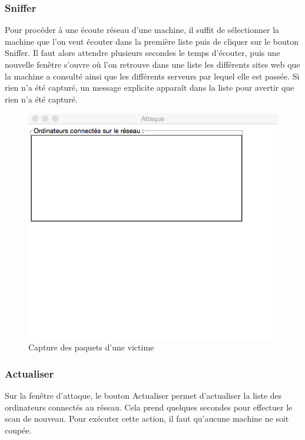 \documentclass[11pt]{article}
\begin{document}
\subsubsection{Sniffer}
Pour procéder à une écoute réseau d'une machine, il suffit de sélectionner la machine que l'on veut écouter dans la première liste puis de cliquer sur le bouton Sniffer. Il faut alors attendre plusieurs secondes le temps d'écouter, puis une nouvelle fenêtre s'ouvre où l'on retrouve dans une liste les différents sites web que la machine a consulté ainsi que les différents serveurs par lequel elle est passée. Si rien n'a été capturé, un message explicite apparaît dans la liste pour avertir que rien n'a été capturé.
\begin{figure}[!h]
\centering
\includegraphics[scale=0.6]{./Captures/fausseFenetre.png}
\caption{Capture des paquets d'une victime}
\end{figure}
\subsubsection{Actualiser}
Sur la fenêtre d'attaque, le bouton Actualiser permet d'actualiser la liste des ordinateurs connectés au réseau. Cela prend quelques secondes pour effectuer le scan de nouveau. Pour exécuter cette action, il faut qu'aucune machine ne soit coupée.
\end{document}
